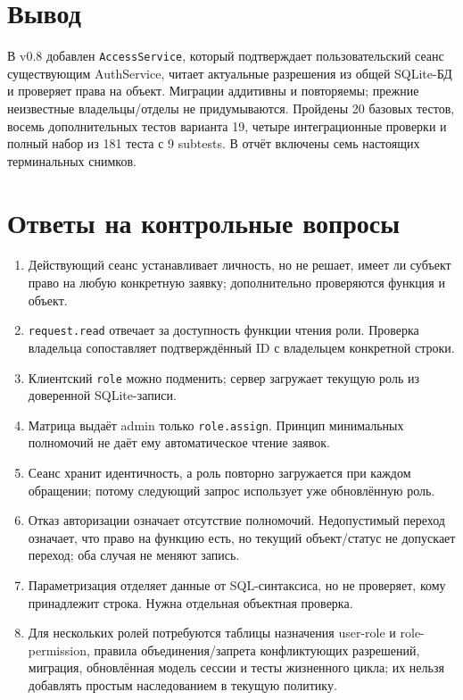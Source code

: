 \documentclass[12pt,a4paper]{article}
\begin{document}
\section{Вывод}
В v0.8 добавлен \texttt{AccessService}, который подтверждает пользовательский сеанс существующим AuthService, читает актуальные разрешения из общей SQLite-БД и проверяет права на объект. Миграции аддитивны и повторяемы; прежние неизвестные владельцы/отделы не придумываются. Пройдены 20 базовых тестов, восемь дополнительных тестов варианта 19, четыре интеграционные проверки и полный набор из 181 теста с 9 subtests. В отчёт включены семь настоящих терминальных снимков.

\section{Ответы на контрольные вопросы}
\begin{enumerate}
\item Действующий сеанс устанавливает личность, но не решает, имеет ли субъект право на любую конкретную заявку; дополнительно проверяются функция и объект.
\item \texttt{request.read} отвечает за доступность функции чтения роли. Проверка владельца сопоставляет подтверждённый ID с владельцем конкретной строки.
\item Клиентский \texttt{role} можно подменить; сервер загружает текущую роль из доверенной SQLite-записи.
\item Матрица выдаёт admin только \texttt{role.assign}. Принцип минимальных полномочий не даёт ему автоматическое чтение заявок.
\item Сеанс хранит идентичность, а роль повторно загружается при каждом обращении; потому следующий запрос использует уже обновлённую роль.
\item Отказ авторизации означает отсутствие полномочий. Недопустимый переход означает, что право на функцию есть, но текущий объект/статус не допускает переход; оба случая не меняют запись.
\item Параметризация отделяет данные от SQL-синтаксиса, но не проверяет, кому принадлежит строка. Нужна отдельная объектная проверка.
\item Для нескольких ролей потребуются таблицы назначения user-role и role-permission, правила объединения/запрета конфликтующих разрешений, миграция, обновлённая модель сессии и тесты жизненного цикла; их нельзя добавлять простым наследованием в текущую политику.
\end{enumerate}
\end{document}
